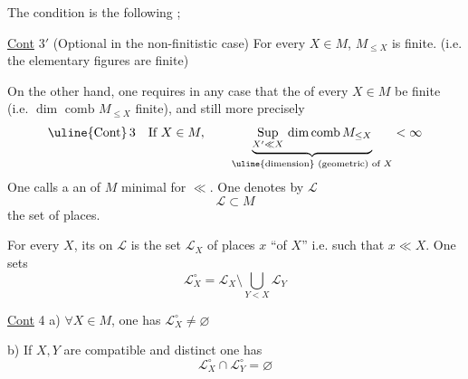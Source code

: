  The condition is the following ; 

\uline{Cont} $3'$ (Optional in the non-finitistic case) \deleted{$\forall$} For every $X\in M$,   $M_{\leq X}$ is finite. (i.e. the elementary figures are finite)

On the other hand, one requires in any case that the  of every  $X\in M$ be finite (i.e. $\dim\text{ comb }M_{\leq X}$ finite), and still more  precisely
\[
\uline{\text{Cont}}\,3 \quad \text{If } X\in M,\qquad
\underbrace{\mathop{\mathrm{Sup}}\limits_{X'\ll X}\,\mathrm{dim\,comb}\,M_{\leq X}}_{\text{\uline{dimension} (geometric) of }X}<\infty
\]
One calls a  an  of $M$ minimal for $\ll$. One denotes by $\mathcal L$
\[
\mathcal L\subset M
\]
the set of places.

For every $X$, its   on $\mathcal L$ is the set $\mathcal L_{X}$ of places $x$  ``of $X$'' i.e. such that $x\ll X$. One sets
\[
\mathcal L_X^{\circ}=\mathcal L_X\setminus\bigcup_{Y<X}\mathcal L_Y
\]

\uline{Cont} 4 \quad a) $\forall X\in M$, one has $\mathcal L_X^{\circ}\neq\varnothing$

b) If $X,Y$ are compatible and distinct one has
\[
\mathcal L_X^{\circ}\cap \mathcal L_Y^{\circ}=\varnothing
\]
